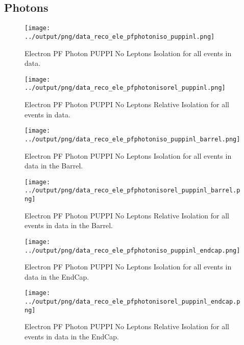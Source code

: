 \documentclass[11pt]{book}
\begin{document}
\subsection{Photons}
\begin{figure}[htb]
\centering
\texttt{[image: ../output/png/data\_reco\_ele\_pfphotoniso\_puppinl.png]}
\caption{Electron PF Photon PUPPI No Leptons Isolation for all events in data.}
\label{fig:data_ele_pfphotoniso_puppinl}
\end{figure}

\begin{figure}[htb]
\centering
\texttt{[image: ../output/png/data\_reco\_ele\_pfphotonisorel\_puppinl.png]}
\caption{Electron PF Photon PUPPI No Leptons Relative Isolation for all events in data.}
\label{fig:data_ele_pfphotonisorel_puppinl}
\end{figure}

\begin{figure}[htb]
\centering
\texttt{[image: ../output/png/data\_reco\_ele\_pfphotoniso\_puppinl\_barrel.png]}
\caption{Electron PF Photon PUPPI No Leptons Isolation for all events in data in the Barrel.}
\label{fig:data_ele_pfphotoniso_puppinl_barrel}
\end{figure}

\begin{figure}[htb]
\centering
\texttt{[image: ../output/png/data\_reco\_ele\_pfphotonisorel\_puppinl\_barrel.png]}
\caption{Electron PF Photon PUPPI No Leptons Relative Isolation for all events in data in the Barrel.}
\label{fig:data_ele_pfphotonisorel_puppinl_barrel}
\end{figure}

\begin{figure}[htb]
\centering
\texttt{[image: ../output/png/data\_reco\_ele\_pfphotoniso\_puppinl\_endcap.png]}
\caption{Electron PF Photon PUPPI No Leptons Isolation for all events in data in the EndCap.}
\label{fig:data_ele_pfphotoniso_puppinl_endcap}
\end{figure}

\begin{figure}[htb]
\centering
\texttt{[image: ../output/png/data\_reco\_ele\_pfphotonisorel\_puppinl\_endcap.png]}
\caption{Electron PF Photon PUPPI No Leptons Relative Isolation for all events in data in the EndCap.}
\label{fig:data_ele_pfphotonisorel_puppinl_endcap}
\end{figure}
\clearpage
\end{document}
